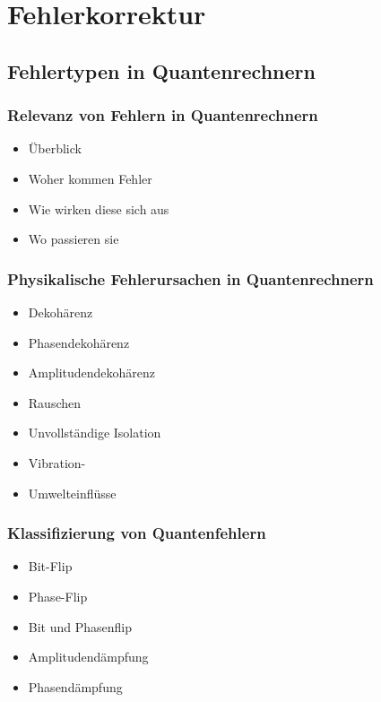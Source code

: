 \chapter{Fehlerkorrektur}
\label{error_correction} %



\section{Fehlertypen in Quantenrechnern}

\subsection{Relevanz von Fehlern in Quantenrechnern}
\begin{itemize}
\item Überblick
\item Woher kommen Fehler
\item Wie wirken diese sich aus
\item Wo passieren sie
\end{itemize}

\subsection{Physikalische Fehlerursachen in Quantenrechnern}
\begin{itemize}
\item Dekohärenz
\item Phasendekohärenz
\item Amplitudendekohärenz 
\item Rauschen
\item Unvollständige Isolation 
\item Vibration-
\item Umwelteinflüsse
\end{itemize}

\subsection{Klassifizierung von Quantenfehlern}
\begin{itemize}
\item Bit-Flip
\item Phase-Flip
\item Bit und Phasenflip
\item Amplitudendämpfung
\item Phasendämpfung
\end{itemize}



